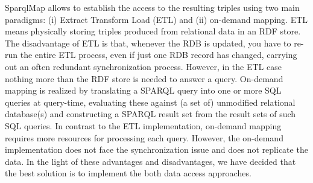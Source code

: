 \documentclass[ngerman,UKenglish,table]{scrbook}
\begin{document}
SparqlMap allows to establish the access to the resulting triples using two main paradigms: (i) Extract Transform Load (ETL) and (ii) on-demand mapping.
ETL means physically storing triples produced from relational data in an RDF store.
The disadvantage of ETL is that, whenever the RDB is updated, you have to re-run the entire ETL process, even if just one RDB record has changed, carrying out an often redundant synchronization process.
However, in the ETL case nothing more than the RDF store is needed to answer a query.
On-demand mapping is realized by translating a SPARQL query into one or more SQL queries at query-time, evaluating these against (a set of) unmodified relational database(s) and constructing a SPARQL result set from the result sets of such SQL queries.
In contrast to the ETL implementation, on-demand mapping requires more resources for processing each query.
However, the on-demand implementation does not face the synchronization issue and does not replicate the data.
In the light of these advantages and disadvantages, we have decided that the best solution is to implement the both data access approaches.
\end{document}
